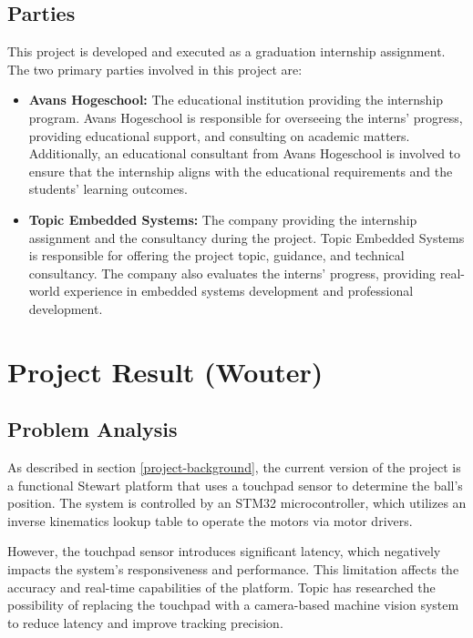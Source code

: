 \documentclass{article}
\begin{document}
\subsection{Parties}

This project is developed and executed as a graduation internship assignment.
The two primary parties involved in this project are:

\begin{itemize} 
    \item \textbf{Avans Hogeschool:} The educational institution
        providing the internship program. Avans Hogeschool is responsible for overseeing
        the interns' progress, providing educational support, and consulting on academic
        matters. Additionally, an educational consultant from Avans Hogeschool is
        involved to ensure that the internship aligns with the educational requirements
        and the students' learning outcomes. 
    \item \textbf{Topic Embedded Systems:} The
        company providing the internship assignment and the consultancy during the
        project. Topic Embedded Systems is responsible for offering the project topic,
        guidance, and technical consultancy. The company also evaluates the interns'
        progress, providing real-world experience in embedded systems development and
        professional development. 
\end{itemize}




\newpage
\section{Project Result (Wouter)}


\subsection{Problem Analysis} As described in section \ref{project-background},
the current version of the project is a functional Stewart platform that uses a
touchpad sensor to determine the ball's position. The system is controlled by an
STM32 microcontroller, which utilizes an inverse kinematics lookup table to
operate the motors via motor drivers.

However, the touchpad sensor introduces significant latency, which negatively
impacts the system’s responsiveness and performance. This limitation affects the
accuracy and real-time capabilities of the platform. Topic has researched the
possibility of replacing the touchpad with a camera-based machine vision system
to reduce latency and improve tracking precision.
\end{document}
